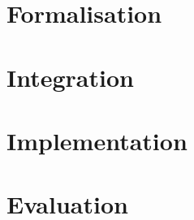 





\chapter{Formalisation}\label{ch:Formalisation}
\chapter{Integration}\label{ch:Integration}
\chapter{Implementation}\label{ch:Implementation}
\chapter{Evaluation}\label{ch:Evaluation}